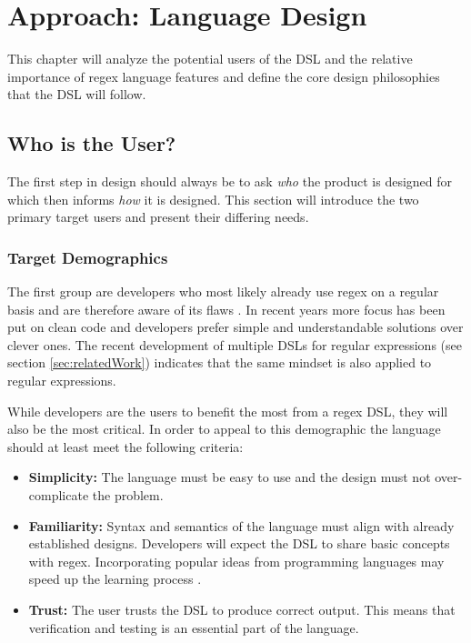 
\chapter{Approach: Language Design}

This chapter will analyze the potential users of the DSL and the relative importance of regex language features and define the core design philosophies that the DSL will follow.

\section{Who is the User?}

The first step in design should always be to ask \emph{who} the product is designed for which then informs \emph{how} it is designed. This section will introduce the two primary target users and present their differing needs.

\subsection{Target Demographics}

The first group are developers who most likely already use regex on a regular basis and are therefore aware of its flaws \cite{RegexNotLinguaFranca}\cite{RegexesAreHard}. In recent years more focus has been put on clean code and developers prefer simple and understandable solutions over clever ones. The recent development of multiple DSLs for regular expressions (see section \ref{sec:relatedWork}) indicates that the same mindset is also applied to regular expressions.

While developers are the users to benefit the most from a regex DSL, they will also be the most critical. In order to appeal to this demographic the language should at least meet the following criteria:

\begin{itemize}
    \item \textbf{Simplicity:} 
        The language must be easy to use and the design must not over-complicate the problem. 
    \item \textbf{Familiarity:}
        Syntax and semantics of the language must align with already established designs. Developers will expect the DSL to share basic concepts with regex. Incorporating popular ideas from programming languages may speed up the learning process \cite{OnSuccessfulLanuageDesignKernighan}. 
    \item \textbf{Trust:}
        The user trusts the DSL to produce correct output. This means that verification and testing is an essential part of the language.
\end{itemize}

